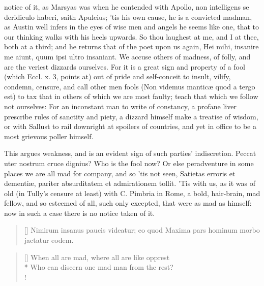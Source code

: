 {notice of it, as Marsyas was when he contended with Apollo, non
intelligens se deridiculo haberi, saith  Apuleius; 'tis his own
cause, he is a convicted madman, as Austin well infers in the eyes
of wise men and angels he seems like one, that to our thinking walks
with his heels upwards. So thou laughest at me, and I at thee, both at
a third; and he returns that of the poet upon us again, Hei mihi,
insanire me aiunt, quum ipsi ultro insaniant. We accuse others of
madness, of folly, and are the veriest dizzards ourselves. For it is a
great sign and property of a fool (which Eccl. x. 3, points at) out of
pride and self-conceit to insult, vilify, condemn, censure, and call
other men fools (Non videmus mantic\ae{} quod a tergo est) to tax that in
others of which we are most faulty; teach that which we follow not
ourselves: For an inconstant man to write of constancy, a profane liver
prescribe rules of sanctity and piety, a dizzard himself make a
treatise of wisdom, or with Sallust to rail downright at spoilers of
countries, and yet in office to be a most grievous poller himself.

This argues weakness, and is an evident sign of such parties'
indiscretion. Peccat uter nostrum cruce dignius? Who is the fool
now? Or else peradventure in some places we are all mad for company,
and so 'tis not seen, Satietas erroris et dementi\ae{}, pariter
absurditatem et admirationem tollit. 'Tis with us, as it was of old (in
Tully's censure at least) with C. Pimbria in Rome, a bold,
hair-brain, mad fellow, and so esteemed of all, such only excepted,
that were as mad as himself: now in such a case there is no notice
taken of it.

\settowidth{\versewidth}{Maxima pars hominum morbo jactatur eodem.}
\begin{verse}[\versewidth]
Nimirum insanus paucis videatur; eo quod
Maxima pars hominum morbo jactatur eodem.
\end{verse}

\settowidth{\versewidth}{When all are mad, where all are like opprest}
\begin{verse}[\versewidth]
When all are mad, where all are like opprest\\*
Who can discern one mad man from the rest?\\!
\end{verse}

}
